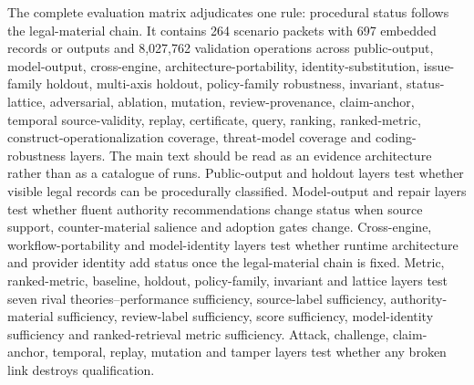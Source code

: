 \documentclass[12pt,a4paper]{article}
\begin{document}
The complete evaluation matrix adjudicates one rule: procedural status follows the legal-material chain. It contains 264 scenario packets with 697 embedded records or outputs and 8,027,762 validation operations across public-output, model-output, cross-engine, architecture-portability, identity-substitution, issue-family holdout, multi-axis holdout, policy-family robustness, invariant, status-lattice, adversarial, ablation, mutation, review-provenance, claim-anchor, temporal source-validity, replay, certificate, query, ranking, ranked-metric, construct-operationalization coverage, threat-model coverage and coding-robustness layers. The main text should be read as an evidence architecture rather than as a catalogue of runs. Public-output and holdout layers test whether visible legal records can be procedurally classified. Model-output and repair layers test whether fluent authority recommendations change status when source support, counter-material salience and adoption gates change. Cross-engine, workflow-portability and model-identity layers test whether runtime architecture and provider identity add status once the legal-material chain is fixed. Metric, ranked-metric, baseline, holdout, policy-family, invariant and lattice layers test seven rival theories--performance sufficiency, source-label sufficiency, authority-material sufficiency, review-label sufficiency, score sufficiency, model-identity sufficiency and ranked-retrieval metric sufficiency. Attack, challenge, claim-anchor, temporal, replay, mutation and tamper layers test whether any broken link destroys qualification.
\end{document}
